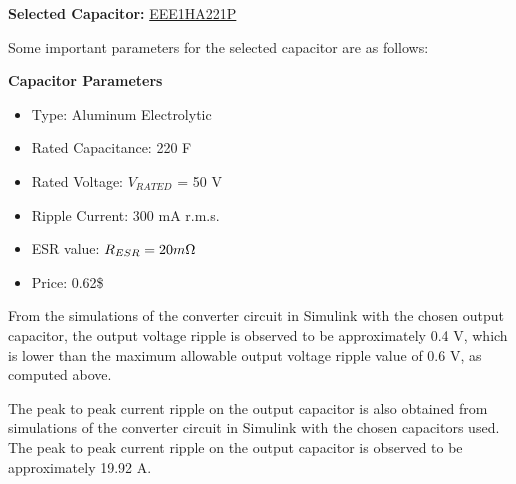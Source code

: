 \textbf{Selected Capacitor: } \href{https://media.digikey.com/pdf/Data\%20Sheets/Panasonic\%20Electronic\%20Components/S_Series,Type_V_Rev2018.pdf}{EEE1HA221P}

Some important parameters for the selected capacitor are as follows:

\textbf{Capacitor Parameters}

\begin{itemize}
    \item Type: Aluminum Electrolytic
    \item Rated Capacitance: 220 \micro F
    \item Rated Voltage: $V_{RATED}$ = 50 V
    \item Ripple Current: 300 mA r.m.s.
    \item ESR value: $R_{ESR} = 20m\ohm$
    \item Price: 0.62\$
\end{itemize}

From the simulations of the converter circuit in Simulink with the chosen output capacitor, the output voltage ripple is observed to be approximately 0.4 V, which is lower than the maximum allowable output voltage ripple value of 0.6 V, as computed above.

The peak to peak current ripple on the output capacitor is also obtained from simulations of the converter circuit in Simulink with the chosen capacitors used. The peak to peak current ripple on the output capacitor is observed to be approximately 19.92 A.